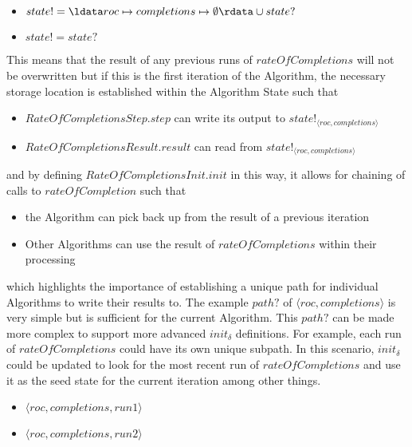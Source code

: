 \documentclass[../main.tex]{subfiles}
\begin{document}
\begin{itemize}
\item $state! = \ldata roc \mapsto completions \mapsto \emptyset \rdata \cup state?$
\item $state! = state?$
\end{itemize}
This means that the result of any previous runs of $rateOfCompletions$ will not be overwritten
but if this is the first iteration of the Algorithm, the necessary storage location is established
within the Algorithm State such that
\begin{itemize}
\item $RateOfCompletionsStep.step$ can write its output to $state!_{\langle roc, completions \rangle}$
\item $RateOfCompletionsResult.result$ can read from $state!_{\langle roc, completions \rangle}$
\end{itemize}
and by defining $RateOfCompletionsInit.init$ in this way, it allows for chaining of calls to $rateOfCompletion$ such that
\begin{itemize}
\item the Algorithm can pick back up from the result of a previous iteration
\item Other Algorithms can use the result of $rateOfCompletions$ within their processing
\end{itemize}
which highlights the importance of establishing a unique path for individual Algorithms to write their results to.
The example $path?$ of $\langle roc, completions \rangle$ is very simple but is sufficient for the current Algorithm.
This $path?$ can be made more complex to support more advanced $init_{\delta}$ definitions. For example, each run of
$rateOfCompletions$ could have its own unique subpath. In this scenario, $init_{\delta}$ could be updated to look for
the most recent run of $rateOfCompletions$ and use it as the seed state for the current iteration among other things.
\begin{itemize}
\item $\langle roc, completions, run1 \rangle$
\item $\langle roc, completions, run2 \rangle$
\end{itemize}
\end{document}
